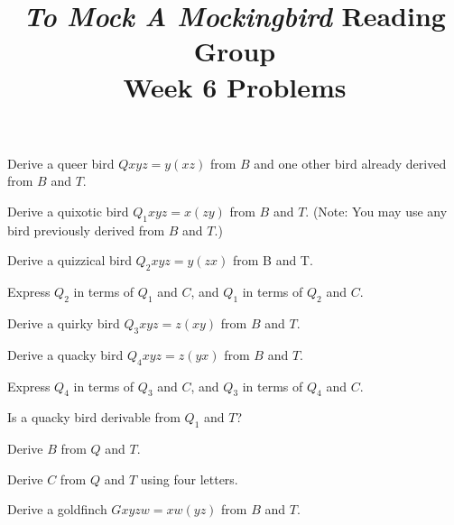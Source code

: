 \documentclass[12pt, letterpaper]{article}
\title{\emph{To Mock A Mockingbird} Reading Group\\Week 6 Problems}
\begin{document}
\maketitle

\disclaimer

\begin{prob}{11.37}  
Derive a queer bird $Qxyz = y(xz)$ from $B$ and one other bird already derived from $B$ and $T$.
\end{prob}

\begin{prob}{11.38}  
Derive a quixotic bird $Q_1xyz = x(zy)$ from $B$ and $T$. (Note: You may use any bird previously derived from $B$ and $T$.)
\end{prob}

\begin{prob}{11.39}  
Derive a quizzical bird $Q_2xyz = y(zx)$ from B and T.
\end{prob}

\begin{prob}{11.40}  
Express $Q_2$ in terms of $Q_1$ and $C$, and $Q_1$ in terms of $Q_2$ and $C$.
\end{prob}

\begin{prob}{11.41}  
Derive a quirky bird $Q_3xyz = z(xy)$ from $B$ and $T$.
\end{prob}

\begin{prob}{11.42}  
Derive a quacky bird $Q_4xyz = z(yx)$ from $B$ and $T$.
\end{prob}

\begin{prob}{11.43}  
Express $Q_4$ in terms of $Q_3$ and $C$, and $Q_3$ in terms of $Q_4$ and $C$.
\end{prob}

\begin{prob}{11.44}  
Is a quacky bird derivable from $Q_1$ and $T$?
\end{prob}

\begin{prob}{11.45}  
Derive $B$ from $Q$ and $T$.
\end{prob}

\begin{prob}{11.46}  
Derive $C$ from $Q$ and $T$ using four letters.
\end{prob}

\begin{prob}{11.47}  
Derive a goldfinch $Gxyzw = xw(yz)$ from $B$ and $T$.
\end{prob}
\end{document}
